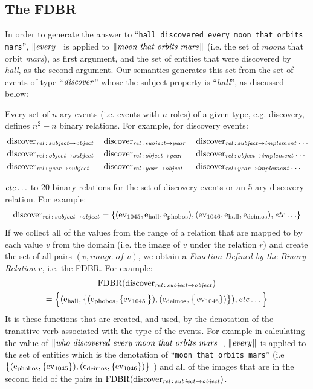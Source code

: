 \documentclass[../main.tex]{subfiles}
\begin{document}
\begin{refsection}
\subsection{The FDBR}
\label{webist2019journal:fdbr}

In order to generate the  answer to ``\texttt{hall discovered every moon that orbits mars}'', $\meaningof{every}$ is applied to $\meaningof{moon that orbits mars}$ (i.e. the set of \textit{moons} that orbit \textit{mars}), as first argument, and the set of entities  that were discovered by \textit{hall}, as the second argument.
Our semantics generates this set from the set of events of type ``$\opit{discover}$'' whose the subject property is ``\textit{hall}'', as discussed below:

Every set of $n$-ary events (i.e. events with $n$ roles) of a given type, e.g. discovery, defines $n^2 - n$ binary relations. For example, for discovery events:
\begin{alignat*}{3}
	&\relationn{discover}{subject}{object} &&\relationn{discover}{subject}{year} &&\relationn{discover}{subject}{implement} \dots \\
	&\relationn{discover}{object}{subject} &&\relationn{discover}{object}{year} &&\relationn{discover}{object}{implement} \dots \\
	&\relationn{discover}{year}{subject} &&\relationn{discover}{year}{object} &&\relationn{discover}{year}{implement} \dots
\end{alignat*}

\noindent $\etc$ to 20 binary relations for  the set of discovery events or an 5-ary discovery relation. For example:
\begin{multline*}
	\relationn{discover}{subject}{object} = \{(\event{1045}, \entity{hall}, \entity{phobos}), (\event{1046}, \entity{hall}, \entity{deimos}), \etc\}
\end{multline*}
If we collect all of the values from the range of a relation that are mapped to by each value $v$ from the domain (i.e. the image of $v$ under the relation $r$) and create the set of all pairs $(v, image\_of\_v)$, we obtain a {\em Function Defined by the Binary Relation} $r$, i.e. the FDBR. For example:
\begin{multline*}
	\FDBR{\relationn{discover}{subject}{object}} \\ = \Big\{ ( \entity{hall}, \big\{(\entity{phobos}, \{\event{1045}\big\}), (\entity{deimos}, \big\{\event{1046}\}) \big\}), \etc\Big\}
\end{multline*}
It is these functions that are created, and used, by the denotation of the transitive verb associated with the type of the events. For example in calculating the value of $\meaningof{who\ discovered\ every\ moon\ that\ orbits\ mars}$, $\meaningof{every}$ is applied to the set of entities which is the denotation of ``\texttt{moon that orbits mars}'' (i.e $\big\{ (\entity{phobos}, \{\event{1045}\}), \\ (\entity{deimos}, \{\event{1046}\})\big\}$ ) and all of the images that are in the second field of the pairs in $\FDBR{\relationn{discover}{subject}{object}}$.


\end{refsection}
\end{document}

